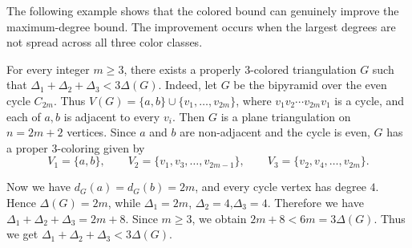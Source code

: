 \documentclass{patmorin}
\begin{document}
The following example shows that the colored bound can genuinely improve the maximum-degree bound. 
The improvement occurs when the largest degrees are not spread across all three color classes.
\begin{exa}
For every integer $m\ge 3$, there exists a properly $3$-colored triangulation $G$ such that $\Delta_1+\Delta_2+\Delta_3<3\Delta(G)$.
Indeed, let $G$ be the bipyramid over the even cycle $C_{2m}$. 
Thus $V(G)=\{a,b\}\cup \{v_1,\dots,v_{2m}\}$,
where $v_1v_2\cdots v_{2m}v_1$ is a cycle, and each of $a,b$ is adjacent to every $v_i$. Then $G$ is a plane triangulation on $n=2m+2$ vertices.
Since $a$ and $b$ are non-adjacent and the cycle is even, $G$ has a proper $3$-coloring given by
\[
V_1=\{a,b\},\qquad
V_2=\{v_1,v_3,\dots,v_{2m-1}\},\qquad
V_3=\{v_2,v_4,\dots,v_{2m}\}.
\]

Now we have  $d_G(a)=d_G(b)=2m$, and every cycle vertex has degree $4$. 
Hence $\Delta(G)=2m$,
while $\Delta_1=2m$, $\Delta_2=4$,$\Delta_3=4$.
Therefore we have $\Delta_1+\Delta_2+\Delta_3=2m+8$.
Since $m\ge 3$, we obtain $2m+8<6m=3\Delta(G)$.
Thus we get $\Delta_1+\Delta_2+\Delta_3<3\Delta(G)$.

\begin{figure}[H]
\centering

\begin{minipage}[t]{0.48\textwidth}
    \centering
\end{minipage}
\end{figure}
\end{exa}
\end{document}
